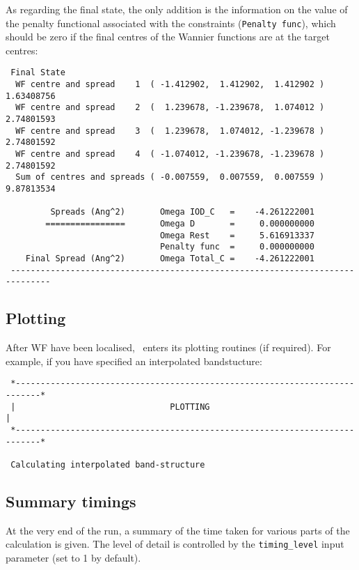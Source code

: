 As regarding the final state, the only addition is the information on the value
of the penalty functional associated with the constraints ({\tt Penalty func}), which should be zero if the final centres
of the Wannier functions are at the target centres:
\begin{verbatim}
 Final State
  WF centre and spread    1  ( -1.412902,  1.412902,  1.412902 )     1.63408756
  WF centre and spread    2  (  1.239678, -1.239678,  1.074012 )     2.74801593
  WF centre and spread    3  (  1.239678,  1.074012, -1.239678 )     2.74801592
  WF centre and spread    4  ( -1.074012, -1.239678, -1.239678 )     2.74801592
  Sum of centres and spreads ( -0.007559,  0.007559,  0.007559 )     9.87813534

         Spreads (Ang^2)       Omega IOD_C   =    -4.261222001
        ================       Omega D       =     0.000000000
                               Omega Rest    =     5.616913337
                               Penalty func  =     0.000000000
    Final Spread (Ang^2)       Omega Total_C =    -4.261222001
 ------------------------------------------------------------------------------
\end{verbatim}


\subsection{Plotting}

After WF have been localised, \wannier\ enters its plotting routines
(if required). For example, if you have specified an interpolated
bandstucture: 

\begin{verbatim}
 *---------------------------------------------------------------------------*
 |                               PLOTTING                                    |
 *---------------------------------------------------------------------------*
  
 Calculating interpolated band-structure
\end{verbatim}

\subsection{Summary timings}

At the very end of the run, a summary of the time taken for various
parts of the calculation is given. The level of detail is controlled
by the {\tt timing\_level} input parameter (set to 1 by default).

